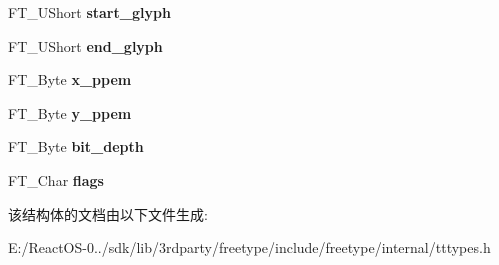 \begin{DoxyCompactItemize}
F\+T\+\_\+\+U\+Short {\bfseries start\+\_\+glyph}
\item 
\mbox{\label{struct_t_t___s_bit___strike_rec___a1af21e0ef936193b22575ea75bad487f}} 
F\+T\+\_\+\+U\+Short {\bfseries end\+\_\+glyph}
\item 
\mbox{\label{struct_t_t___s_bit___strike_rec___a2a1b17c24df2084fe485aefe8f34e7d4}} 
F\+T\+\_\+\+Byte {\bfseries x\+\_\+ppem}
\item 
\mbox{\label{struct_t_t___s_bit___strike_rec___ad618814b841b86e7763f1aa371e04fed}} 
F\+T\+\_\+\+Byte {\bfseries y\+\_\+ppem}
\item 
\mbox{\label{struct_t_t___s_bit___strike_rec___ac57b360af4620bd06251d098f5da23bb}} 
F\+T\+\_\+\+Byte {\bfseries bit\+\_\+depth}
\item 
\mbox{\label{struct_t_t___s_bit___strike_rec___a38735f8c00b23deb25ffab798c0aa7b7}} 
F\+T\+\_\+\+Char {\bfseries flags}
\end{DoxyCompactItemize}


该结构体的文档由以下文件生成\+:\begin{DoxyCompactItemize}
\item 
E\+:/\+React\+O\+S-\/0../sdk/lib/3rdparty/freetype/include/freetype/internal/tttypes.\+h\end{DoxyCompactItemize}

